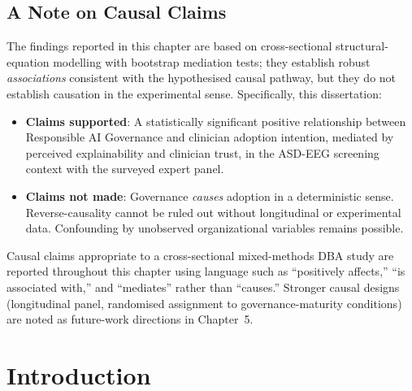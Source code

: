 \subsection*{A Note on Causal Claims}

\noindent The findings reported in this chapter are based on cross-sectional structural-equation modelling with bootstrap mediation tests; they establish robust \emph{associations} consistent with the hypothesised causal pathway, but they do not establish causation in the experimental sense. Specifically, this dissertation:

\begin{itemize}[leftmargin=*, itemsep=2pt]
    \item \textbf{Claims supported}: A statistically significant positive relationship between Responsible AI Governance and clinician adoption intention, mediated by perceived explainability and clinician trust, in the ASD-EEG screening context with the surveyed expert panel.
    \item \textbf{Claims not made}: Governance \emph{causes} adoption in a deterministic sense. Reverse-causality cannot be ruled out without longitudinal or experimental data. Confounding by unobserved organizational variables remains possible.
\end{itemize}

\noindent Causal claims appropriate to a cross-sectional mixed-methods DBA study are reported throughout this chapter using language such as ``positively affects,'' ``is associated with,'' and ``mediates'' rather than ``causes.'' Stronger causal designs (longitudinal panel, randomised assignment to governance-maturity conditions) are noted as future-work directions in Chapter~5.

\section{Introduction}





